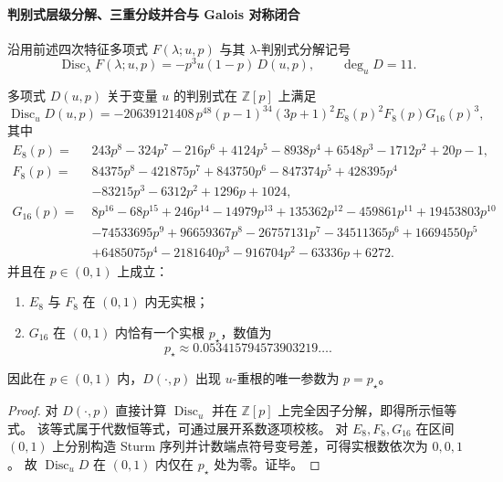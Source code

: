 \paragraph{判别式层级分解、三重分歧并合与 Galois 对称闭合}
沿用前述四次特征多项式 \(F(\lambda;u,p)\) 与其 \(\lambda\)-判别式分解记号
\[
\operatorname{Disc}_{\lambda}F(\lambda;u,p)
=-p^3u(1-p)\,D(u,p),
\qquad
\deg_u D=11.
\]

\begin{theorem}[判别式之判别式的完全分解与唯一临界偏置]\label{thm:xi-discriminant-of-discriminant-complete-factorization}
多项式 \(D(u,p)\) 关于变量 \(u\) 的判别式在 \(\mathbb Z[p]\) 上满足
\[
\operatorname{Disc}_{u}D(u,p)
=-20639121408\,
p^{48}(p-1)^{34}(3p+1)^2
E_8(p)^2
F_8(p)
G_{16}(p)^3,
\]
其中
\[
\begin{aligned}
E_8(p)=\;&243p^{8}-324p^{7}-216p^{6}+4124p^{5}-8938p^{4}+6548p^{3}-1712p^{2}+20p-1,\\
F_8(p)=\;&84375p^{8}-421875p^{7}+843750p^{6}-847374p^{5}+428395p^{4}\\
&-83215p^{3}-6312p^{2}+1296p+1024,\\
G_{16}(p)=\;&8p^{16}-68p^{15}+246p^{14}-14979p^{13}+135362p^{12}-459861p^{11}+19453803p^{10}\\
&-74533695p^{9}+96659367p^{8}-26757131p^{7}-34511365p^{6}+16694550p^{5}\\
&+6485075p^{4}-2181640p^{3}-916704p^{2}-63336p+6272.
\end{aligned}
\]
并且在 \(p\in(0,1)\) 上成立：
\begin{enumerate}
  \item \(E_8\) 与 \(F_8\) 在 \((0,1)\) 内无实根；
  \item \(G_{16}\) 在 \((0,1)\) 内恰有一个实根 \(p_\star\)，数值为
  \[
  p_\star\approx0.053415794573903219\ldots.
  \]
\end{enumerate}
因此在 \(p\in(0,1)\) 内，\(D(\cdot,p)\) 出现 \(u\)-重根的唯一参数为 \(p=p_\star\)。
\end{theorem}
\begin{proof}
对 \(D(\cdot,p)\) 直接计算 \(\operatorname{Disc}_{u}\) 并在 \(\mathbb Z[p]\) 上完全因子分解，即得所示恒等式。
该等式属于代数恒等式，可通过展开系数逐项校核。
对 \(E_8,F_8,G_{16}\) 在区间 \((0,1)\) 上分别构造 Sturm 序列并计数端点符号变号差，可得实根数依次为 \(0,0,1\)。
故 \(\operatorname{Disc}_{u}D\) 在 \((0,1)\) 内仅在 \(p_\star\) 处为零。证毕。
\end{proof}

